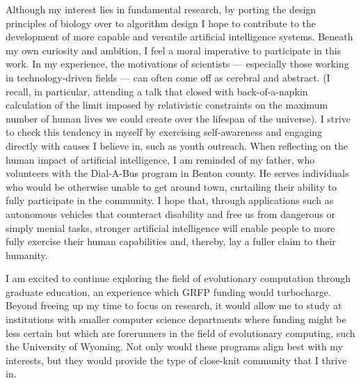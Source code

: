 Although my interest lies in fundamental research, by porting the design principles of biology over to algorithm design I hope to contribute to the development of more capable and versatile artificial intelligence systems.
Beneath my own curiosity and ambition, I feel a moral imperative to participate in this work.
In my experience, the motivations of scientists --- especially those working in technology-driven fields --- can often come off as cerebral and abstract.
(I recall, in particular, attending a talk that closed with back-of-a-napkin calculation of the limit imposed by relativistic constraints on the maximum number of human lives we could create over the lifespan of the universe).
I strive to check this tendency in myself by exercising self-awareness and engaging directly with causes I believe in, such as youth outreach.
When reflecting on the human impact of artificial intelligence, I am reminded of my father, who volunteers with the Dial-A-Bus program in Benton county.
He serves individuals who would be otherwise unable to get around town, curtailing their ability to fully participate in the community.
I hope that, through applications such as autonomous vehicles that counteract disability and free us from dangerous or simply menial tasks, stronger artificial intelligence will enable people to more fully exercise their human capabilities and, thereby, lay a fuller claim to their humanity.


I am excited to continue exploring the field of evolutionary computation through graduate education, an experience which GRFP funding would turbocharge.
Beyond freeing up my time to focus on research, it would allow me to study at institutions with smaller computer science departments where funding might be less certain but which are forerunners in the field of evolutionary computing, such the University of Wyoming.
Not only would these programs align best with my interests, but they would provide the type of close-knit community that I thrive in.



